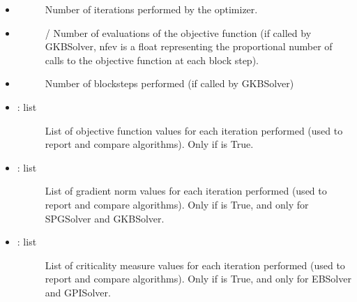 \documentclass[a4paper,10pt,english]{sphinxmanual}
\begin{document}
\begin{fulllineitems}
\begin{itemize}
\begin{description}
\end{description}

\item {} \begin{description}
\item[{}] \leavevmode{[}\sphinxcode{int}{]}
Number of iterations performed by the optimizer.

\end{description}

\item {} \begin{description}
\item[{}] \leavevmode{[}/\sphinxcode{float}{]}
Number of evaluations of the objective function (if called by 
GKBSolver, nfev is a float representing the proportional number
of calls to the objective function at each block step).

\end{description}

\item {} \begin{description}
\item[{}] \leavevmode{[}\sphinxcode{int}{]}
Number of blocksteps performed (if called by GKBSolver)

\end{description}

\item {} \begin{description}
\item[{: list}] \leavevmode
List of objective function values for each iteration performed 
(used to report and compare algorithms). Only if 
is True.

\end{description}

\item {} \begin{description}
\item[{: list}] \leavevmode
List of gradient norm values for each iteration performed 
(used to report and compare algorithms). Only if 
is True, and only for SPGSolver and GKBSolver.

\end{description}

\item {} \begin{description}
\item[{: list}] \leavevmode
List of criticality measure values for each iteration performed 
(used to report and compare algorithms). Only if 
is True, and only for EBSolver and GPISolver.


\end{description}
\end{itemize}
\end{fulllineitems}
\end{document}
